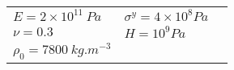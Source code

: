 \begin{tabular}{l|lN}
    \hline
    $E=2\times 10^{11}\:Pa$ & $\sigma^y=4 \times 10^8 Pa$ &\\ [3pt]
    $\nu=0.3$ & $H=10^{9} Pa$ & \\[3pt]
    $\rho_0 = 7800 \: kg.m^{-3}$ & & \\[3pt]
    \hline
\end{tabular}